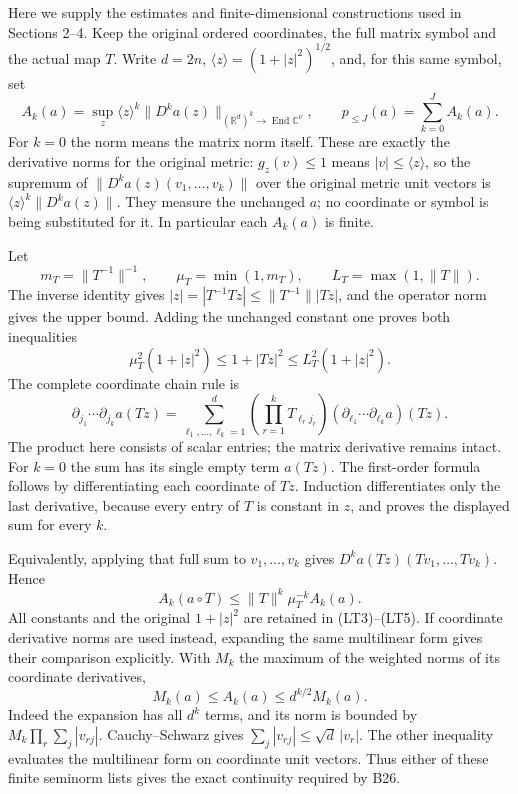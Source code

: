 \documentclass[
  11pt,
]{article}
\begin{document}
Here we supply the estimates and finite-dimensional constructions used
in Sections 2--4. Keep the original ordered coordinates, the full matrix
symbol and the actual map \(T\). Write \(d=2n\),
\(\langle z\rangle=(1+|z|^2)^{1/2}\), and, for this same symbol, set \[
 A_k(a)=\sup_z\langle z\rangle^k
       \|D^k a(z)\|_{(\mathbb R^d)^k\to\operatorname{End}\mathbb C^\nu},
 \qquad p_{\le J}(a)=\sum_{k=0}^J A_k(a).
 \tag{LT1}
\] For \(k=0\) the norm means the matrix norm itself. These are exactly
the derivative norms for the original metric: \(g_z(v)\le1\) means
\(|v|\le\langle z\rangle\), so the supremum of
\(\|D^ka(z)(v_1,\ldots,v_k)\|\) over the original metric unit vectors is
\(\langle z\rangle^k\|D^ka(z)\|\). They measure the unchanged \(a\); no
coordinate or symbol is being substituted for it. In particular each
\(A_k(a)\) is finite.

Let \[
 m_T=\|T^{-1}\|^{-1},\qquad
 \mu_T=\min(1,m_T),\qquad L_T=\max(1,\|T\|).
 \tag{LT2}
\] The inverse identity gives \(|z|=|T^{-1}Tz|\le\|T^{-1}\||Tz|\), and
the operator norm gives the upper bound. Adding the unchanged constant
one proves both inequalities \[
 \mu_T^2(1+|z|^2)\le1+|Tz|^2
                 \le L_T^2(1+|z|^2).
 \tag{LT3}
\] The complete coordinate chain rule is \[
 \partial_{j_1}\cdots\partial_{j_k}a(Tz)
 =\sum_{\ell_1,\ldots,\ell_k=1}^d
       \left(\prod_{r=1}^k T_{\ell_rj_r}\right)
       (\partial_{\ell_1}\cdots\partial_{\ell_k}a)(Tz).
 \tag{LT4}
\] The product here consists of scalar entries; the matrix derivative
remains intact. For \(k=0\) the sum has its single empty term \(a(Tz)\).
The first-order formula follows by differentiating each coordinate of
\(Tz\). Induction differentiates only the last derivative, because every
entry of \(T\) is constant in \(z\), and proves the displayed sum for
every \(k\).

Equivalently, applying that full sum to \(v_1,\ldots,v_k\) gives
\(D^ka(Tz)(Tv_1,\ldots,Tv_k)\). Hence \[
 A_k(a\circ T)\le\|T\|^k\mu_T^{-k}A_k(a).
 \tag{LT5}
\] All constants and the original \(1+|z|^2\) are retained in
(LT3)--(LT5). If coordinate derivative norms are used instead, expanding
the same multilinear form gives their comparison explicitly. With
\(M_k\) the maximum of the weighted norms of its coordinate derivatives,
\[
 M_k(a)\le A_k(a)\le d^{k/2}M_k(a).
 \tag{LT6}
\] Indeed the expansion has all \(d^k\) terms, and its norm is bounded
by \(M_k\prod_r\sum_j|v_{rj}|\). Cauchy--Schwarz gives
\(\sum_j|v_{rj}|\le\sqrt d\,|v_r|\). The other inequality evaluates the
multilinear form on coordinate unit vectors. Thus either of these finite
seminorm lists gives the exact continuity required by B26.
\end{document}
